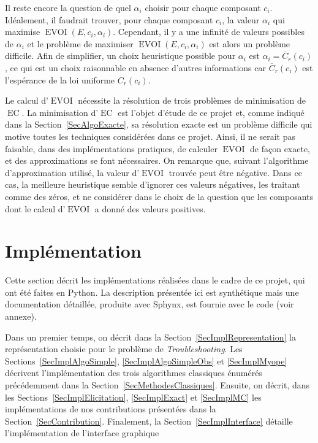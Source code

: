 \documentclass[a4paper,11pt]{article}
\theoremstyle{plain}
\theoremstyle{definition}
\DeclareMathOperator{\EC}{EC}
\DeclareMathOperator{\EVOI}{EVOI}
\begin{document}
Il reste encore la question de quel $\alpha_i$ choisir pour chaque composant $c_i$. Idéalement, il faudrait trouver, pour chaque composant $c_i$, la valeur $\alpha_i$ qui maximise $\EVOI(E, c_i, \alpha_i)$. Cependant, il y a une infinité de valeurs possibles de $\alpha_i$ et le problème de maximiser $\EVOI(E, c_i, \alpha_i)$ est alors un problème difficile. Afin de simplifier, un choix heuristique possible pour $\alpha_i$ est $\alpha_i = \overline C_r(c_i)$, ce qui est un choix raisonnable en absence d'autres informations car $\overline C_r(c_i)$ est l'espérance de la loi uniforme $C_r(c_i)$.

Le calcul d'$\EVOI$ nécessite la résolution de trois problèmes de minimisation de $\EC$. La minimisation d'$\EC$ est l'objet d'étude de ce projet et, comme indiqué dans la Section~\ref{SecAlgoExacte}, sa résolution exacte est un problème difficile qui motive toutes les techniques considérées dans ce projet. Ainsi, il ne serait pas faisable, dans des implémentations pratiques, de calculer $\EVOI$ de façon exacte, et des approximations se font nécessaires. On remarque que, suivant l'algorithme d'approximation utilisé, la valeur d'$\EVOI$ trouvée peut être négative. Dans ce cas, la meilleure heuristique semble d'ignorer ces valeurs négatives, les traitant comme des zéros, et ne considérer dans le choix de la question que les composants dont le calcul d'$\EVOI$ a donné des valeurs positives.

\section{Implémentation}
\label{SecImplementation}

Cette section décrit les implémentations réalisées dans le cadre de ce projet, qui ont été faites en Python. La description présentée ici est synthétique mais une documentation détaillée, produite avec Sphynx, est fournie avec le code (voir annexe).

Dans un premier temps, on décrit dans la Section~\ref{SecImplRepresentation} la représentation choisie pour le problème de \emph{Troubleshooting}. Les Sections~\ref{SecImplAlgoSimple}, \ref{SecImplAlgoSimpleObs} et \ref{SecImplMyope} décrivent l'implémentation des trois algorithmes classiques énumérés précédemment dans la Section~\ref{SecMethodesClassiques}. Ensuite, on décrit, dans les Sections~\ref{SecImplElicitation}, \ref{SecImplExact} et \ref{SecImplMC} les implémentations de nos contributions présentées dans la Section~\ref{SecContribution}. Finalement, la Section~\ref{SecImplInterface} détaille l'implémentation de l'interface graphique
\end{document}
